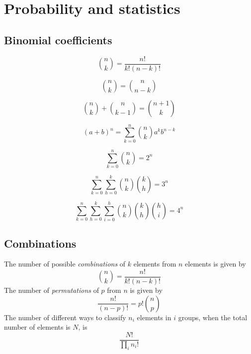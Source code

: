 \chapter{Probability and statistics}

\section{Binomial coefficients}
\begin{multicols}{3}
	
	\[ \binom{n}{k} = \frac{n!}{k!(n-k)!} \]
	
	\[ \binom{n}{k} = \binom{n}{n-k} \]
	
	\[ \binom{n}{k} + \binom{n}{k-1} = \binom{n+1}{k} \]
	
	\[ (a+b)^n = \sum_{k=0}^{n}\binom{n}{k}a^kb^{n-k} \]
	
	\[ \sum_{k=0}^{n}\binom{n}{k} = 2^n \]
	
	\[ \sum_{k=0}^{n}\sum_{h=0}^{k}\binom{n}{k}\binom{k}{h} = 3^n \]
	
	\[ \sum_{k=0}^{n}\sum_{h=0}^{k}\sum_{i=0}^{h}\binom{n}{k}\binom{k}{h}\binom{h}{i} = 4^n \]
	
\end{multicols}

\section{Combinations}
The number of possible {\it combinations} of $k$ elements from $n$ elements is
given by
\[
{n\choose k}=\frac{n!}{k!(n-k)!}
\]
The number of {\it permutations} of $p$ from $n$ is given by
\[
\frac{n!}{(n-p)!}=p!{n\choose p}
\]
The number of different ways to classify $n_i$ elements in $i$ groups, when
the total number of elements is $N$, is
\[
\frac{N!}{\prod\limits_i n_i!}
\]

